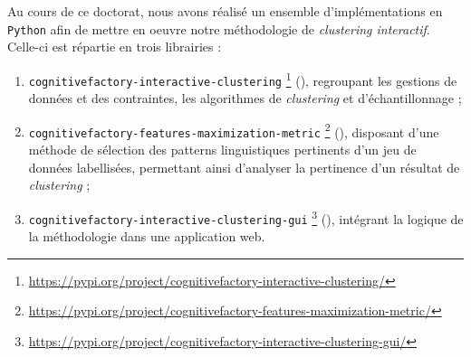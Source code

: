 		Au cours de ce doctorat, nous avons réalisé un ensemble d'implémentations en \texttt{Python} afin de mettre en oeuvre notre méthodologie de \textit{clustering interactif}.
		Celle-ci est répartie en trois librairies :
		\begin{enumerate}
			\item \texttt{cognitivefactory-interactive-clustering} \footnote{
				\url{https://pypi.org/project/cognitivefactory-interactive-clustering/}
			} (\cite{schild:2022:cognitivefactory-interactiveclustering}), regroupant les gestions de données et des contraintes, les algorithmes de \textit{clustering} et d'échantillonnage ;
			\item \texttt{cognitivefactory-features-maximization-metric} \footnote{
				\url{https://pypi.org/project/cognitivefactory-features-maximization-metric/}
			} (\cite{schild:2023:cognitivefactory-featuresmaximizationmetric}), disposant d'une méthode de sélection des patterns linguistiques pertinents d'un jeu de données labellisées, permettant ainsi d'analyser la pertinence d'un résultat de \textit{clustering} ;
			\item \texttt{cognitivefactory-interactive-clustering-gui} \footnote{
				\url{https://pypi.org/project/cognitivefactory-interactive-clustering-gui/}
			} (\cite{schild-etal:2022:cognitivefactory-interactiveclusteringgui}), intégrant la logique de la méthodologie dans une application web.
		\end{enumerate}
		
